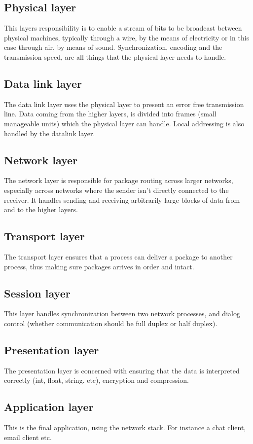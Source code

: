 \subsection{Physical layer}
This layers responsibility is to enable a stream of bits to be broadcast between physical machines, typically through a wire, by the means of electricity or in this case through air, by means of sound. Synchronization, encoding and the transmission speed, are all things that the physical layer needs to handle.

\subsection{Data link layer}
The data link layer uses the physical layer to present an error free transmission line. Data coming from the higher layers, is divided into frames (small manageable units) which the physical layer can handle. Local addressing is also handled by the datalink layer.

\subsection{Network layer}
The network layer is responsible for package routing across larger networks, especially across networks where the sender isn't directly connected to the receiver. It handles sending and receiving arbitrarily large blocks of data from and to the higher layers.

\subsection{Transport layer}
The transport layer ensures that a process can deliver a package to another process, thus making sure packages arrives in order and intact.

\subsection{Session layer}
This layer handles synchronization between two network processes, and dialog control (whether communication should be full duplex or half duplex).

\subsection{Presentation layer}
The presentation layer is concerned with ensuring that the data is interpreted correctly (int, float, string. etc), encryption and compression.

\subsection{Application layer}
This is the final application, using the network stack. For instance a chat client, email client etc.
